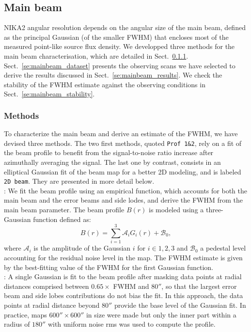 \subsection{Main beam}
\label{se:mainbeam}

NIKA2 angular resolution depends on the angular size of the main beam,
defined as the principal Gaussian (of the smaller FWHM) that encloses
most of the measured point-like source flux density. We developped
three methods for the main beam characterisation, which are detailed
in Sect.~\ref{se:mainbeam_methods}. Sect.~\ref{se:mainbeam_dataset}
presents the observing scans we have selected to derive the results
discussed in Sect.~\ref{se:mainbeam_results}. We check the stability
of the FWHM estimate against the observing conditions in
Sect.~\ref{se:mainbeam_stability}.


\subsubsection{Methods}
\label{se:mainbeam_methods}
To characterize the main beam and derive an estimate of the FWHM, we
have devised three methods. The two first methods, quoted
{\tt Prof 1\&2}, rely on a fit
of the beam profile to benefit from the signal-to-noise ratio increase
after azimuthally averaging the signal. The last one by contrast,
consists in an elliptical Gaussian fit of the beam map for a better
2D modeling, and is labeled {\tt 2D beam}. They are presented in more
detail below. \\

: We fit the beam profile using an empirical function,
which accounts for both the main beam and the error beams and side
lodes, and derive the FWHM from the main beam parameter. The beam
profile $B(r)$ is modeled using a three-Gaussian function defined as:
\begin{equation}
  B(r) = \sum_{i=1}^{3} \mathcal{A}_i G_i(r) + \mathcal{B}_0,
  \label{eq:3gauss}
\end{equation}
where $\mathcal{A}_i$ is the amplitude of the Gaussian $i$ for $i \in {1, 2, 3}$ and
$\mathcal{B}_0$ a pedestal level accounting for the residual noise
level in the map. The FWHM estimate is given by the best-fitting value
of the FWHM for the first Gaussian function.\\

: A single Gaussian is fit to the beam profile after
masking data points at radial distances comprised between
$0.65 \times$ FWHM and $80''$, so that the largest error beam and
side lobes contributions do not bias the fit. In this approach, the
data points at radial distance beyond $80''$ provide the base level
of the Gaussian fit. In practice, maps $600'' \times 600''$ in size
were made but only the inner part within a radius of $180''$ with
uniform noise rms was used to compute the profile.\\

